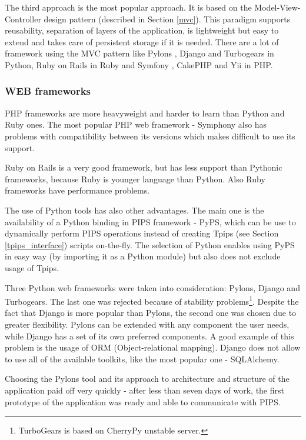 The third approach is the most popular approach. It is based on the Model-View-Controller design pattern (described in Section \ref{mvc}). This paradigm supports reusability, separation of layers of the application, is lightweight but easy to extend and takes care of persistent storage if it is needed. There are a lot of framework using the MVC pattern like Pylons \cite{pylons}, Django \cite{django} and Turbogears \cite{turbogears} in Python, Ruby on Rails \cite{rubyonrails} in Ruby and Symfony \cite{symfony}, CakePHP \cite{cakephp} and Yii \cite{yii} in PHP.

\subsubsection{WEB frameworks}

PHP frameworks are more heavyweight and harder to learn than Python and Ruby ones. The most popular PHP web framework - Symphony also has problems with compatibility between its versions which makes difficult to use its support.

Ruby on Rails is a very good framework, but has less support than Pythonic frameworks, because Ruby is younger language than Python. Also Ruby frameworks have performance problems.

The use of Python tools has also other advantages. The main one is the availability of a Python binding in PIPS framework - PyPS, which can be use to dynamically perform PIPS operations instead of creating Tpips (see Section \ref{tpips_interface}) scripts on-the-fly. The selection of Python enables using PyPS in easy way (by importing it as a Python module) but also does not exclude usage of Tpips.

Three Python web frameworks were taken into consideration: Pylons, Django and Turbogears. The last one was rejected because of stability problems\footnote{TurboGears is based on CherryPy \cite{cherrypy} unstable server.}. Despite the fact that Django is more popular than Pylons, the second one was chosen due to greater flexibility. Pylons can be extended with any component the user needs, while Django has a set of its own preferred components. A good example of this problem is the usage of ORM (Object-relational mapping\cite{orm}). Django does not allow to use all of the available toolkits, like the most popular one - SQLAlchemy\cite{sqlalchemy}.

Choosing the Pylons tool and its approach to architecture and structure of the application paid off very quickly - after less than seven days of work, the first prototype of the application was ready and able to communicate with PIPS. 

